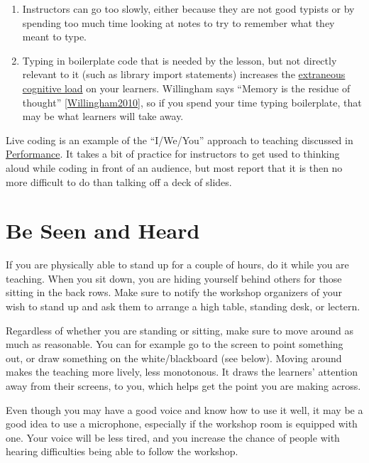 \documentclass[10pt,statementpaper]{memoir}
\begin{document}
\begin{enumerate}
\def\labelenumi{\arabic{enumi}.}
\item
  Instructors can go too slowly, either because they are not good
  typists or by spending too much time looking at notes to try to
  remember what they meant to type.
\item
  Typing in boilerplate code that is needed by the lesson, but not
  directly relevant to it (such as library import statements) increases
  the \href{load.html}{extraneous cognitive load} on your learners.
  Willingham says ``Memory is the residue of thought''
  {[}\href{biblio.html\#willingham-dont-like-school}{Willingham2010}{]},
  so if you spend your time typing boilerplate, that may be what
  learners will take away.
\end{enumerate}

Live coding is an example of the ``I/We/You'' approach to teaching
discussed in \href{performance.html}{Performance}. It takes a bit of
practice for instructors to get used to thinking aloud while coding in
front of an audience, but most report that it is then no more difficult
to do than talking off a deck of slides.

\section{Be Seen and Heard}\label{be-seen-and-heard}

If you are physically able to stand up for a couple of hours, do it
while you are teaching. When you sit down, you are hiding yourself
behind others for those sitting in the back rows. Make sure to notify
the workshop organizers of your wish to stand up and ask them to arrange
a high table, standing desk, or lectern.

Regardless of whether you are standing or sitting, make sure to move
around as much as reasonable. You can for example go to the screen to
point something out, or draw something on the white/blackboard (see
below). Moving around makes the teaching more lively, less monotonous.
It draws the learners' attention away from their screens, to you, which
helps get the point you are making across.

Even though you may have a good voice and know how to use it well, it
may be a good idea to use a microphone, especially if the workshop room
is equipped with one. Your voice will be less tired, and you increase
the chance of people with hearing difficulties being able to follow the
workshop.
\end{document}
